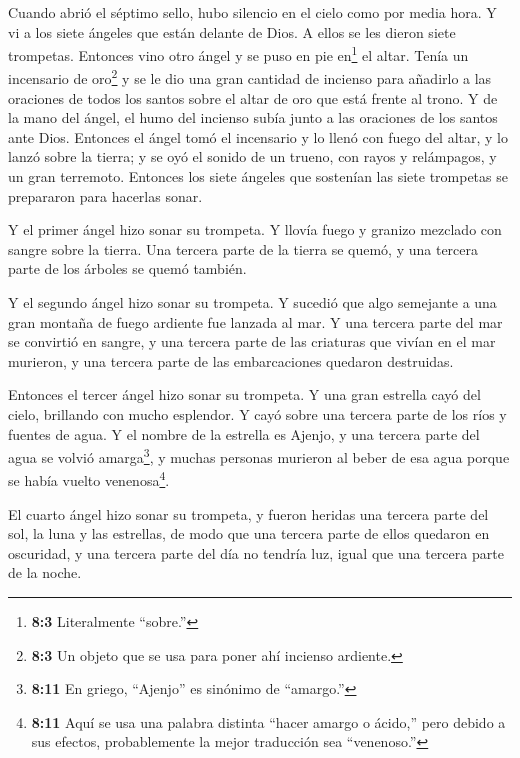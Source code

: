  Cuando abrió el séptimo sello, hubo silencio en el cielo
como por media hora.  Y vi a los siete ángeles que están
delante de Dios. A ellos se les dieron siete trompetas. 
Entonces vino otro ángel y se puso en pie en\footnote{\textbf{8:3}
  Literalmente ``sobre.''} el altar. Tenía un incensario de
oro\footnote{\textbf{8:3} Un objeto que se usa para poner ahí incienso
  ardiente.} y se le dio una gran cantidad de incienso para añadirlo a
las oraciones de todos los santos sobre el altar de oro que está frente
al trono.  Y de la mano del ángel, el humo del incienso
subía junto a las oraciones de los santos ante Dios. 
Entonces el ángel tomó el incensario y lo llenó con fuego del altar, y
lo lanzó sobre la tierra; y se oyó el sonido de un trueno, con rayos y
relámpagos, y un gran terremoto.  Entonces los siete ángeles
que sostenían las siete trompetas se prepararon para hacerlas sonar.

 Y el primer ángel hizo sonar su trompeta. Y llovía fuego y
granizo mezclado con sangre sobre la tierra. Una tercera parte de la
tierra se quemó, y una tercera parte de los árboles se quemó también.

 Y el segundo ángel hizo sonar su trompeta. Y sucedió que
algo semejante a una gran montaña de fuego ardiente fue lanzada al mar.
Y una tercera parte del mar se convirtió en sangre,  y una
tercera parte de las criaturas que vivían en el mar murieron, y una
tercera parte de las embarcaciones quedaron destruidas.

 Entonces el tercer ángel hizo sonar su trompeta. Y una
gran estrella cayó del cielo, brillando con mucho esplendor. Y cayó
sobre una tercera parte de los ríos y fuentes de agua.  Y
el nombre de la estrella es Ajenjo, y una tercera parte del agua se
volvió amarga\footnote{\textbf{8:11} En griego, ``Ajenjo'' es sinónimo
  de ``amargo.''}, y muchas personas murieron al beber de esa agua
porque se había vuelto venenosa\footnote{\textbf{8:11} Aquí se usa una
  palabra distinta ``hacer amargo o ácido,'' pero debido a sus efectos,
  probablemente la mejor traducción sea ``venenoso.''}.

 El cuarto ángel hizo sonar su trompeta, y fueron heridas
una tercera parte del sol, la luna y las estrellas, de modo que una
tercera parte de ellos quedaron en oscuridad, y una tercera parte del
día no tendría luz, igual que una tercera parte de la noche.

